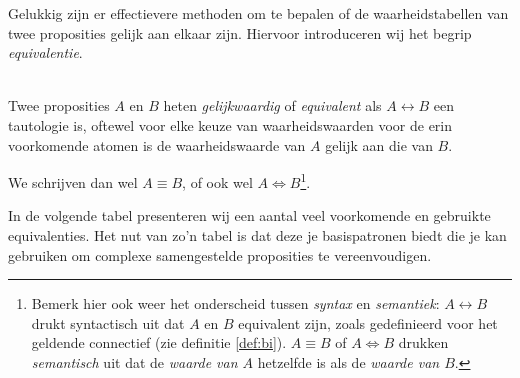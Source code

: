 Gelukkig zijn er effectievere methoden om te bepalen of de waarheidstabellen van twee proposities gelijk aan elkaar zijn. Hiervoor introduceren wij het begrip \textit{equivalentie}.
%
\begin{definition}[Equivalentie]\mbox{}\\
Twee proposities $A$ en $B$ heten \textit{gelijkwaardig} of \textit{equivalent} als $A\leftrightarrow B$ een tautologie is, oftewel voor elke keuze van waarheidswaarden voor de erin voorkomende atomen is de waarheidswaarde van $A$ gelijk aan die van $B$.

\noindent
We schrijven dan wel $A\equiv B$, of ook wel $A\Leftrightarrow B$\footnote{Bemerk hier ook weer het onderscheid tussen \textit{syntax} en \textit{semantiek}: $A\leftrightarrow B$ drukt syntactisch uit dat $A$ en $B$ equivalent zijn, zoals gedefinieerd voor het geldende connectief (zie definitie \ref{def:bi}). $A\equiv B$ of $A\Leftrightarrow B$ drukken \textit{semantisch} uit dat de \textit{waarde van $A$} hetzelfde is als de \textit{waarde van $B$}.}.
\end{definition}

In de volgende tabel presenteren wij een aantal veel voorkomende en gebruikte equivalenties. Het nut van zo'n tabel is dat deze je basispatronen biedt die je kan gebruiken om complexe samengestelde proposities te vereenvoudigen.

